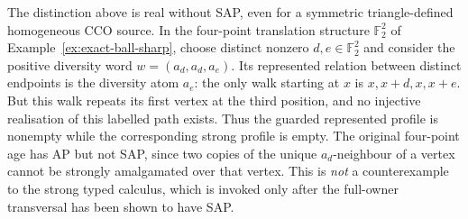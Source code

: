 \begin{example}
\label{ex:typed-walk-SAP-sharp}
The distinction above is real without SAP, even for a symmetric
triangle-defined homogeneous CCO source.  In the four-point
translation structure $\mathbb F_2^2$ of
Example~\ref{ex:exact-ball-sharp}, choose distinct nonzero
$d,e\in\mathbb F_2^2$ and consider the positive diversity word
$w=(a_d,a_d,a_e)$.  Its represented relation between distinct
endpoints is the diversity atom $a_e$: the only walk starting at
$x$ is $x,x+d,x,x+e$.  But this walk repeats its first vertex at
the third position, and no injective realisation of this labelled
path exists.  Thus the guarded represented profile is nonempty
while the corresponding strong profile is empty.  The original
four-point age has AP but not SAP, since two copies of the unique
$a_d$-neighbour of a vertex cannot be strongly amalgamated over
that vertex.  This is \emph{not} a counterexample to the strong
typed calculus, which is invoked only after the full-owner
transversal has been shown to have SAP.
\end{example}

